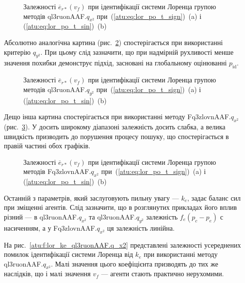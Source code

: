 \begin{figure}[htb!]
  \caption{Залежності $ \overline{e}_{r *} (v_f) $ при ідентифікації системи Лоренца групою методів ql3ruonAAF.$q_{x^2} $ при~(\ref{atu:eq:lor_po_t_sign})~(a) і (\ref{atu:eq:lor_po_t_sin})~(b)}
  \label{atu:f:lor_vf_ql3ruonAAF.q_x2}
\end{figure}

Абсолютно аналогічна картина (рис.~\ref{atu:f:lor_vf_ql3ruonAAF.q_y2})
спостерігається при використанні критерію
$q_{y^2}$.
При цьому слід зазначити, що при надмірній рухливості менше
значення похибки демонструє підхід, засновані на глобальному
оцінюванні
$p_\mathrm{id}$.


\begin{figure}[htb!]
  \caption{Залежності $\overline{e}_{r *} (v_f) $ при ідентифікації системи Лоренца групою методів ql3ruonAAF.$q_{y^2} $ при~(\ref{atu:eq:lor_po_t_sign})~(a) і (\ref{atu:eq:lor_po_t_sin})~(b)}
  \label{atu:f:lor_vf_ql3ruonAAF.q_y2}
\end{figure}

Дещо інша картина спостерігається при використанні методу
Fq3zlovnAAF.$q_{x^2}$
(рис.~\ref{atu:f:lor_vf_Fq3zlovnAAF.q_x2}).
У досить широкому діапазоні залежність досить слабка, а
велика швидкість призводить до порушення процесу пошуку, що
спостерігається в правій частині обох графіків.

\begin{figure}[htb!]
  \caption{Залежності $ \overline{e}_{r *} (v_f) $ при ідентифікації системи Лоренца групою методів Fq3zlovnAAF.$q_{x^2} $ при~(\ref{atu:eq:lor_po_t_sign})~(a) і (\ref{atu:eq:lor_po_t_sin})~(b)}
  \label{atu:f:lor_vf_Fq3zlovnAAF.q_x2}
\end{figure}

Останній з параметрів, який заслуговують пильну увагу ---
$k_e $, задає баланс сил при зміщенні агентів. Слід
зазначити, що в розглянутих прикладах його вплив різний ---
в ql3ruonAAF.$q_{x^2}$ та ql3ruonAAF.$q_{y^2}$
залежність $f_e(p_c-p_e)$ с насиченням,
а у Fq3zlovnAAF.$q_{x^2}$ ця залежність линійна.

На рис.~\ref{atu:f:lor_ke_ql3ruonAAF.q_x2} представлені залежності усереднених
помилок ідентифікації системи Лоренца від
$k_e$ при використанні методу ql3ruonAAF.$q_{x^2} $. Малі значення цього коефіцієнта призводять до тих же
наслідків, що і малі значення $v_f$ --- агенти стають практично нерухомими.


